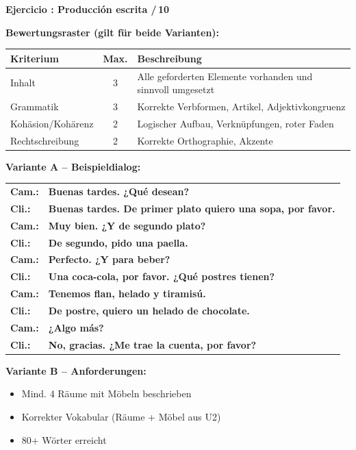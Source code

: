 \documentclass[a4paper,11pt]{article}
\newcommand{\lsg}[1]{{\color{loesung}\textbf{#1}}}
\newcommand{\punkte}[1]{\hfill\textcolor{mittelgrau}{\small /\,#1}}
\newcounter{aufgabe}
\newenvironment{aufgabe}[2]{%
    \refstepcounter{aufgabe}
    \vspace{4mm}
    \noindent\textbf{\color{spanisch}Ejercicio \theaufgabe: #1 \punkte{#2}}
    \vspace{1.5mm}
    \par
}{%
    \vspace{2mm}
}
\begin{document}
\begin{aufgabe}{Producción escrita}{10}

\textbf{Bewertungsraster (gilt für beide Varianten):}

\vspace{2mm}

\begin{tabular}{|l|c|p{9cm}|}
\hline
\textbf{Kriterium} & \textbf{Max.} & \textbf{Beschreibung} \\
\hline
Inhalt & 3 & Alle geforderten Elemente vorhanden und sinnvoll umgesetzt \\
\hline
Grammatik & 3 & Korrekte Verbformen, Artikel, Adjektivkongruenz \\
\hline
Kohäsion/Kohärenz & 2 & Logischer Aufbau, Verknüpfungen, roter Faden \\
\hline
Rechtschreibung & 2 & Korrekte Orthographie, Akzente \\
\hline
\end{tabular}

\vspace{4mm}

\textbf{Variante A -- Beispieldialog:}

\vspace{2mm}

{\small
\begin{tabular}{ll}
\textbf{Cam.:} & \lsg{Buenas tardes. ¿Qué desean?} \\
\textbf{Cli.:} & \lsg{Buenas tardes. De primer plato quiero una sopa, por favor.} \\
\textbf{Cam.:} & \lsg{Muy bien. ¿Y de segundo plato?} \\
\textbf{Cli.:} & \lsg{De segundo, pido una paella.} \\
\textbf{Cam.:} & \lsg{Perfecto. ¿Y para beber?} \\
\textbf{Cli.:} & \lsg{Una coca-cola, por favor. ¿Qué postres tienen?} \\
\textbf{Cam.:} & \lsg{Tenemos flan, helado y tiramisú.} \\
\textbf{Cli.:} & \lsg{De postre, quiero un helado de chocolate.} \\
\textbf{Cam.:} & \lsg{¿Algo más?} \\
\textbf{Cli.:} & \lsg{No, gracias. ¿Me trae la cuenta, por favor?} \\
\end{tabular}
}

\vspace{4mm}

\textbf{Variante B -- Anforderungen:}
\begin{itemize}[itemsep=0mm]
    \item Mind. 4 Räume mit Möbeln beschrieben
    \item Korrekter Vokabular (Räume + Möbel aus U2)
    \item 80+ Wörter erreicht
\end{itemize}


\end{aufgabe}
\end{document}
